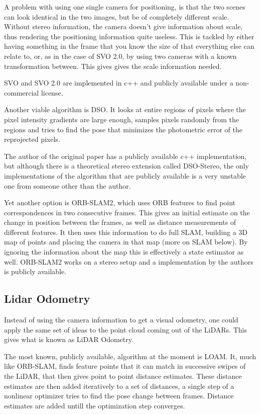 A problem with using one single camera for positioning, is that the two scenes can look identical in the two images, but be of completely different scale. Without stereo information, the camera doesn't give information about scale, thus rendering the positioning information quite useless. This is tackled by either having something in the frame that you know the size of that everything else can relate to, or, as in the case of SVO 2.0, by using two cameras with a known transformation between. This gives gives the scale information needed. 

SVO and SVO 2.0 are implemented in c++ and publicly available under a non-commercial license. 

Another viable algorithm is DSO\cite{DSO}. It looks at entire regions of pixels where the pixel intensity gradients are large enough, samples pixels randomly from the regions and tries to find the pose that minimizes the photometric error of the reprojected pixels. 

The author of the original paper has a publicly available c++ implementation, but although there is a theoretical stereo extension called DSO-Stereo\cite{DSOStereo}, the only implementations of the algorithm that are publicly available is a very unstable one from someone other than the author. 

Yet another option is ORB-SLAM2\cite{ORBSLAM}, which uses ORB features\cite{ORB} to find point correspondences in two consecutive frames. This gives an initial estimate on the change in position between the frames, as well as distance measurements of different features. It then uses this information to do full SLAM, building a 3D map of points and placing the camera in that map (more on SLAM below). By ignoring the information about the map this is effectively a state estimator as well. ORB-SLAM2 works on a stereo setup and a implementation by the authors is publicly available.

\subsection{Lidar Odometry}

Instead of using the camera information to get a visual odometry, one could apply the same set of ideas to the point cloud coming out of the LiDARs. This gives what is known as LiDAR Odometry. 

The most known, publicly available, algorithm at the moment is LOAM\cite{LOAM}. It, much like ORB-SLAM, finds feature points that it can match in successive swipes of the LiDAR, that then gives point to point distance estimates. These distance estimates are then added iteratively to a set of distances, a single step of a nonlinear optimizer tries to find the pose change between frames. Distance estimates are added untill the optimization step converges. 

